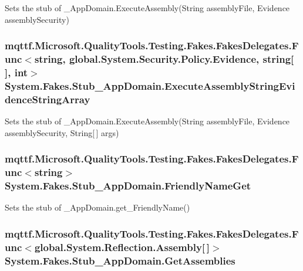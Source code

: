Sets the stub of \-\_\-\-App\-Domain.\-Execute\-Assembly(\-String assembly\-File, Evidence assembly\-Security)

\hypertarget{class_system_1_1_fakes_1_1_stub___app_domain_a1271f2d80769beeb875fc0f5e01c4015}{
\subsubsection[{Execute\-Assembly\-String\-Evidence\-String\-Array}]{\setlength{\rightskip}{0pt plus 5cm}mqttf.\-Microsoft.\-Quality\-Tools.\-Testing.\-Fakes.\-Fakes\-Delegates.\-Func$<$string, global.\-System.\-Security.\-Policy.\-Evidence, string\mbox{[}$\,$\mbox{]}, int$>$ System.\-Fakes.\-Stub\-\_\-\-App\-Domain.\-Execute\-Assembly\-String\-Evidence\-String\-Array}}\label{class_system_1_1_fakes_1_1_stub___app_domain_a1271f2d80769beeb875fc0f5e01c4015}


Sets the stub of \-\_\-\-App\-Domain.\-Execute\-Assembly(\-String assembly\-File, Evidence assembly\-Security, String\mbox{[}$\,$\mbox{]} args)

\hypertarget{class_system_1_1_fakes_1_1_stub___app_domain_a308463f7857102643b35af473852bd75}{
\subsubsection[{Friendly\-Name\-Get}]{\setlength{\rightskip}{0pt plus 5cm}mqttf.\-Microsoft.\-Quality\-Tools.\-Testing.\-Fakes.\-Fakes\-Delegates.\-Func$<$string$>$ System.\-Fakes.\-Stub\-\_\-\-App\-Domain.\-Friendly\-Name\-Get}}\label{class_system_1_1_fakes_1_1_stub___app_domain_a308463f7857102643b35af473852bd75}


Sets the stub of \-\_\-\-App\-Domain.\-get\-\_\-\-Friendly\-Name()

\hypertarget{class_system_1_1_fakes_1_1_stub___app_domain_a0f0f243182430533e13dc4e9bff41299}{
\subsubsection[{Get\-Assemblies}]{\setlength{\rightskip}{0pt plus 5cm}mqttf.\-Microsoft.\-Quality\-Tools.\-Testing.\-Fakes.\-Fakes\-Delegates.\-Func$<$global.\-System.\-Reflection.\-Assembly\mbox{[}$\,$\mbox{]}$>$ System.\-Fakes.\-Stub\-\_\-\-App\-Domain.\-Get\-Assemblies}}\label{class_system_1_1_fakes_1_1_stub___app_domain_a0f0f243182430533e13dc4e9bff41299}


